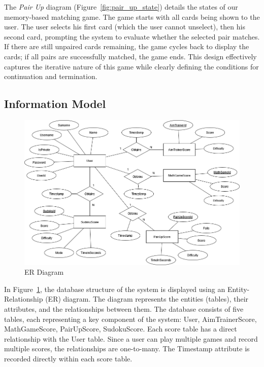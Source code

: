 \documentclass[11pt,a4paper]{article}
\begin{document}
The \textit{Pair Up} diagram (Figure~\ref{fig:pair_up_state}) details the
states of our memory-based matching game. The game starts with all cards being
shown to the user. The user selects his first card (which the user cannot
unselect), then his second card, prompting the system to evaluate whether the
selected pair matches. If there are still unpaired cards remaining, the game cycles
back to display the cards; if all pairs are successfully matched,
the game ends. This design effectively captures the iterative nature of this
game while clearly defining the conditions for continuation and termination.


\subsection{Information Model}

\begin{figure}[H]
    \centering
    \includegraphics[width=\textwidth]{Diagrams/out/PNG/ER_Diagram_fix.drawio.png}
    \caption{ER Diagram}
    \label{fig:ER_diagram}
\end{figure}

In Figure~\ref{fig:ER_diagram}, the database structure of the system is displayed using an Entity-Relationship (ER) diagram. The diagram represents the entities (tables), their attributes, and the relationships between them. The database consists of five tables, each representing a key component of the system: User, AimTrainerScore, MathGameScore, PairUpScore, SudokuScore. Each score table has a direct relationship with the User table. Since a user can play multiple games and record multiple scores, the relationships are one-to-many. The Timestamp attribute is recorded directly within each score table.
\end{document}
